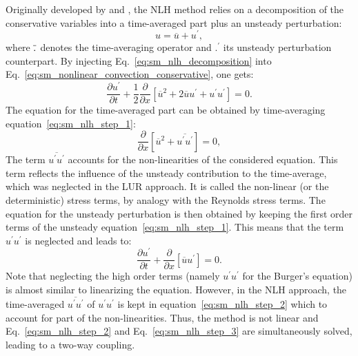 
Originally developed by \citet{He1998} and \citet{Ning1998},
the NLH method
relies on a decomposition of the conservative variables into a
time-averaged part plus an unsteady perturbation:
\begin{equation}
	u = \overline{u} + u^\prime,
	\label{eq:sm_nlh_decomposition}
\end{equation}
where $\overline{\vphantom{u}.}$ denotes the time-averaging operator and
$.^\prime$ its unsteady perturbation counterpart.
By injecting Eq.~\eqref{eq:sm_nlh_decomposition} into
Eq.~\eqref{eq:sm_nonlinear_convection_conservative}, one gets:
\begin{equation}
	\frac{\partial u^\prime}{\partial t} + 
	\frac{1}{2}\frac{\partial}{\partial x} \left[
	\overline{u}^2 + 2 \overline{u} u^\prime + u^\prime u^\prime \right] = 
	0.
	\label{eq:sm_nlh_step_1}
\end{equation}
The equation for the time-averaged part can be obtained by time-averaging
equation~\eqref{eq:sm_nlh_step_1}:
\begin{equation}
	\frac{\partial}{\partial x}
	\left[\overline{u}^2 + 
	\overline{u^\prime u^\prime}\right] =
	0,
	\label{eq:sm_nlh_step_2}
\end{equation}
The term $\overline{u^\prime u^\prime}$
accounts for the non-linearities of the considered equation. 
This term reflects the influence of the unsteady contribution to
the time-average, which was neglected in the LUR approach. It
is called the non-linear 
(or the deterministic) stress terms, by analogy with
the Reynolds stress terms. 
The equation for the unsteady perturbation is then obtained by keeping
the first order terms of the unsteady equation~\eqref{eq:sm_nlh_step_1}.
This means that the term $u^\prime u^\prime$ is neglected and leads
to:
\begin{equation}
	\frac{\partial u^\prime}{\partial t} + 
	\frac{\partial}{\partial x} \left[\overline{u} u^\prime \right] = 
	0.
	\label{eq:sm_nlh_step_3}
\end{equation}
Note that neglecting the high order terms 
(namely $u^\prime u^\prime$ for the Burger's equation) 
is almost similar to
linearizing the equation. However, in the NLH approach,
the time-averaged $\overline{u^\prime u^\prime}$ 
of $u^\prime u^\prime$ is kept in
equation~\eqref{eq:sm_nlh_step_2} which to account for part of the
non-linearities. Thus, the method is not linear and 
Eq.~\eqref{eq:sm_nlh_step_2} and Eq.~\eqref{eq:sm_nlh_step_3} 
are simultaneously solved, leading to a two-way coupling.

